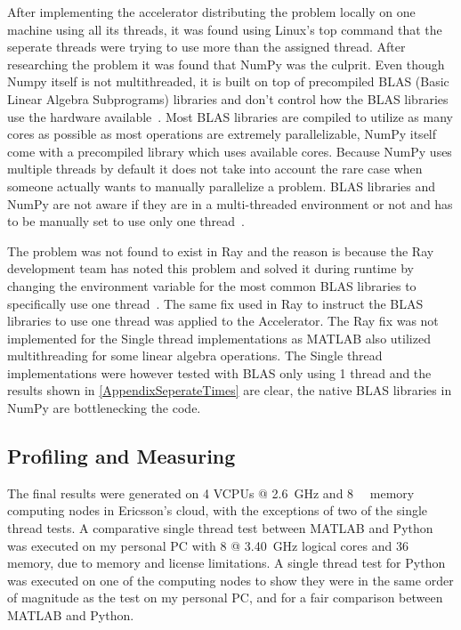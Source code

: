 \documentclass[12pt, a4paper]{article}
\begin{document}
After implementing the accelerator distributing the problem locally on one machine using all its threads, it was found using Linux's top command that the seperate threads were trying to use more than the assigned thread.
After researching the problem it was found that NumPy was the culprit.
Even though Numpy itself is not multithreaded, it is built on top of precompiled BLAS (Basic Linear Algebra Subprograms) libraries and don't control how the BLAS libraries use the hardware available~\cite{Numpy:OpenBLAS}.
Most BLAS libraries are compiled to utilize as many cores as possible as most operations are extremely parallelizable, NumPy itself come with a precompiled library which uses available cores.
Because NumPy uses multiple threads by default it does not take into account the rare case when someone actually wants to manually parallelize a problem. 
BLAS libraries and NumPy are not aware if they are in a multi-threaded environment or not and has to be manually set to use only one thread~\cite{OpenBLAS:threadSafe}.

The problem was not found to exist in Ray and the reason is because the Ray development team has noted this problem and solved it during runtime by changing the environment variable for the most common BLAS libraries to specifically use one thread~\cite{ray:OMPNUMTHREAD}. 
The same fix used in Ray to instruct the BLAS libraries to use one thread was applied to the Accelerator.
The Ray fix was not implemented for the Single thread implementations as MATLAB also utilized multithreading for some linear algebra operations.
The Single thread implementations were however tested with BLAS only using 1 thread and the results shown in \cref{AppendixSeperateTimes} are clear, the native BLAS libraries in NumPy are bottlenecking the code.

\subsection{Profiling and Measuring}

The final results were generated on 4 VCPUs @ \SI{2.6}{\giga\hertz} and \SI{8}{\giga\byte} memory computing nodes in Ericsson's cloud, with the exceptions of two of the single thread tests.
A comparative single thread test between MATLAB and Python was executed on my personal PC with 8 @ \SI{3.40}{\giga\hertz} logical cores and \SI{36}{\giga\byte} memory, due to memory and license limitations. 
A single thread test for Python was executed on one of the computing nodes to show they were in the same order of magnitude as the test on my personal PC, and for a fair comparison between MATLAB and Python.
\end{document}
